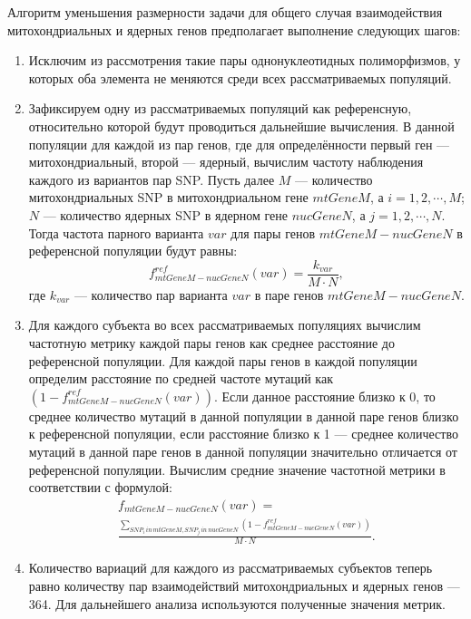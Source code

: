 Алгоритм уменьшения размерности задачи для общего случая взаимодействия митохондриальных и ядерных генов предполагает выполнение следующих шагов:
\begin{enumerate}
	\item Исключим из рассмотрения такие пары однонуклеотидных полиморфизмов, у которых оба элемента не меняются среди всех рассматриваемых популяций.
	\item Зафиксируем одну из рассматриваемых популяций как референсную, относительно которой будут проводиться дальнейшие вычисления. В данной популяции для каждой из пар генов, где для определённости первый ген --- митохондриальный, второй --- ядерный, вычислим частоту наблюдения каждого из вариантов пар SNP. Пусть далее $M$ --- количество митохондриальных SNP в митохондриальном гене $mtGene M$, а $i = 1, 2, \cdots, M$; $N$ --- количество ядерных SNP в ядерном гене $nucGene N$, а $j = 1, 2, \cdots, N$. Тогда частота парного варианта $var$ для пары генов $mtGene M-nucGene N$ в референсной популяции будут равны:
	\begin{equation}
	\label{eq:f_ref_mt_nuc}
	f_{mtGene M-nucGene N}^{ref} (var) = \frac{k_{var}}{M\cdot N},
	\end{equation}
	где $k_{var}$ --- количество пар варианта $var$ в паре генов $mtGene M-nucGene N$.
	\item Для каждого субъекта во всех рассматриваемых популяциях вычислим частотную метрику каждой пары генов как среднее расстояние до референсной популяции. Для каждой пары генов в каждой популяции определим расстояние по средней частоте мутаций как $\left(1 - f_{mtGene M-nucGene N}^{ref} (var)\right)$. Если данное расстояние близко к 0, то среднее количество мутаций в данной популяции в данной паре генов близко к референсной популяции, если расстояние близко к 1 --- среднее количество мутаций в данной паре генов в данной популяции значительно отличается от референсной популяции. Вычислим средние значение частотной метрики в соответствии с формулой:
	\begin{equation}
	\label{eq:f_mt_nuc}
	\begin{multlined}
	f_{mtGene M-nucGene N} (var) =\\ \frac{\sum_{SNP_i\,in\,mtGene M, SNP_j\,in\,nucGene N} \left(1 - f_{mtGene M-nucGene N}^{ref} (var)\right)}{M\cdot N}.
	\end{multlined}
	\end{equation}
	\item Количество вариаций для каждого из рассматриваемых субъектов теперь равно количеству пар взаимодействий митохондриальных и ядерных генов --- 364. Для дальнейшего анализа используются полученные значения метрик.
\end{enumerate}

